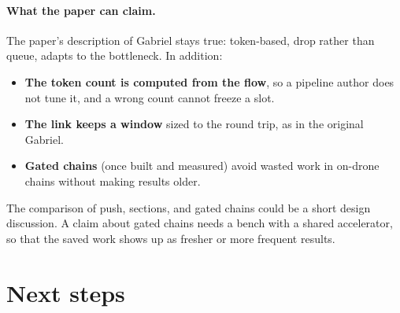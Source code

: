 \documentclass[11pt]{article}
\begin{document}
\paragraph{What the paper can claim.} The paper's description of Gabriel
stays true: token-based, drop rather than queue, adapts to the bottleneck.
In addition:
\begin{itemize}[nosep]
  \item \textbf{The token count is computed from the flow}, so a pipeline
        author does not tune it, and a wrong count cannot freeze a slot.
  \item \textbf{The link keeps a window} sized to the round trip, as in the
        original Gabriel.
  \item \textbf{Gated chains} (once built and measured) avoid wasted work
        in on-drone chains without making results older.
\end{itemize}
The comparison of push, sections, and gated chains could be a short design
discussion. A claim about gated chains needs a bench with a shared
accelerator, so that the saved work shows up as fresher or more frequent
results.

\section{Next steps}
\label{sec:next}
\end{document}

